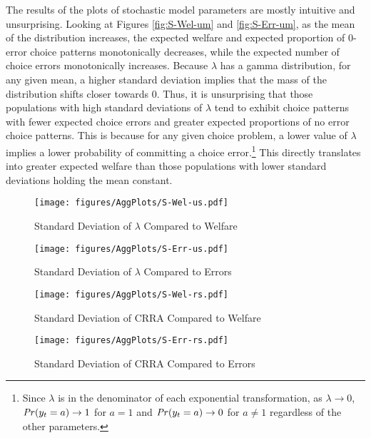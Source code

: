 \documentclass[../main.tex]{subfiles}
\begin{document}
The results of the plots of stochastic model parameters are mostly intuitive and unsurprising.
Looking at Figures \ref{fig:S-Wel-um} and \ref{fig:S-Err-um}, as the mean of the distribution increases, the expected welfare and expected proportion of 0-error choice patterns monotonically decreases, while the expected number of choice errors monotonically increases.
Because $\lambda$ has a gamma distribution, for any given mean, a higher standard deviation implies that the mass of the distribution shifts closer towards $0$.
Thus, it is unsurprising that those populations with high standard deviations of $\lambda$ tend to exhibit choice patterns with fewer expected choice errors and greater expected proportions of no error choice patterns.
This is because for any given choice problem, a lower value of $\lambda$ implies a lower probability of committing a choice error.\footnote{
	Since $\lambda$ is in the denominator of each exponential transformation, as $\lambda \to 0$, ${\mathit{Pr}}(y_t = a) \to 1$ for $a = 1$ and ${\mathit{Pr}}(y_t = a) \to 0$ for $a\neq1$ regardless of the other parameters.
}
This directly translates into greater expected welfare than those populations with lower standard deviations holding the mean constant.

\begin{figure}[h!]
	\center
	\caption{Standard Deviation of $\lambda$ Compared to Welfare}
	\texttt{[image: figures/AggPlots/S-Wel-us.pdf]}
	\label{fig:S-Wel-us}
\end{figure}

\begin{figure}[h!]
	\center
	\caption{Standard Deviation of $\lambda$ Compared to Errors}
	\texttt{[image: figures/AggPlots/S-Err-us.pdf]}
	\label{fig:S-Err-us}
\end{figure}

\begin{figure}[h!]
	\center
	\caption{Standard Deviation of CRRA Compared to Welfare}
	\texttt{[image: figures/AggPlots/S-Wel-rs.pdf]}
	\label{fig:S-Wel-rs}
\end{figure}

\begin{figure}[h!]
	\center
	\caption{Standard Deviation of CRRA Compared to Errors}
	\texttt{[image: figures/AggPlots/S-Err-rs.pdf]}
	\label{fig:S-Err-rs}
\end{figure}
\end{document}
